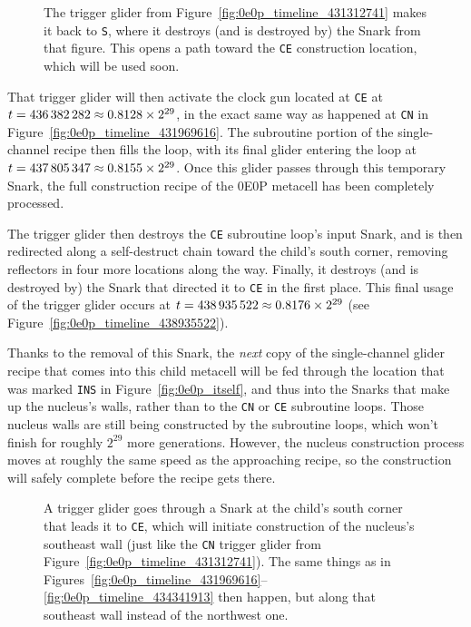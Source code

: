 \begin{figure}[!htb]
	\centering
	\caption{The trigger glider from Figure~\ref{fig:0e0p_timeline_431312741} makes it back to \texttt{S}, where it destroys (and is destroyed by) the Snark from that figure. This opens a path toward the \texttt{CE} construction location, which will be used soon.}
	\label{fig:0e0p_timeline_434724270}
\end{figure}

That trigger glider will then activate the clock gun located at \texttt{CE} at $t = 436{\,}382{\,}282 \approx 0.8128 \times 2^{29}$, in the exact same way as happened at \texttt{CN} in Figure~\ref{fig:0e0p_timeline_431969616}. The subroutine portion of the single-channel recipe then fills the loop, with its final glider entering the loop at $t = 437{\,}805{\,}347 \approx 0.8155 \times 2^{29}$. Once this glider passes through this temporary Snark, the full construction recipe of the 0E0P metacell has been completely processed.

The trigger glider then destroys the \texttt{CE} subroutine loop's input Snark, and is then redirected along a self-destruct chain toward the child's south corner, removing reflectors in four more locations along the way. Finally, it destroys (and is destroyed by) the Snark that directed it to \texttt{CE} in the first place. This final usage of the trigger glider occurs at $t = 438{\,}935{\,}522 \approx 0.8176 \times 2^{29}$ (see Figure~\ref{fig:0e0p_timeline_438935522}).

Thanks to the removal of this Snark, the \emph{next} copy of the single-channel glider recipe that comes into this child metacell will be fed through the location that was marked \texttt{INS} in Figure~\ref{fig:0e0p_itself}, and thus into the Snarks that make up the nucleus's walls, rather than to the \texttt{CN} or \texttt{CE} subroutine loops. Those nucleus walls are still being constructed by the subroutine loops, which won't finish for roughly $2^{29}$ more generations. However, the nucleus construction process moves at roughly the same speed as the approaching recipe, so the construction will safely complete before the recipe gets there.

\begin{figure}[!htb]
	\centering
	\caption{A trigger glider goes through a Snark at the child's south corner that leads it to \texttt{CE}, which will initiate construction of the nucleus's southeast wall (just like the \texttt{CN} trigger glider from Figure~\ref{fig:0e0p_timeline_431312741}). The same things as in Figures~\ref{fig:0e0p_timeline_431969616}--\ref{fig:0e0p_timeline_434341913} then happen, but along that southeast wall instead of the northwest one.}
	\label{fig:0e0p_timeline_435925955}
\end{figure}

